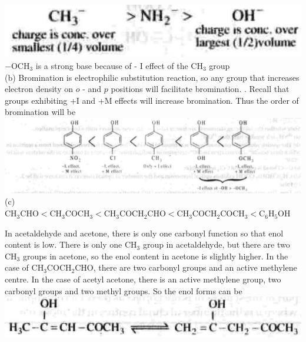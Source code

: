 \documentclass[10pt]{article}
\begin{document}
\includegraphics[max width=\textwidth, center]{2025_01_28_8470952b98110cec3aabg-127}\\
$-\mathrm{OCH}_{3}$ is a strong base because of - I effect of the $\mathrm{CH}_{3}$ group\\
(b) Bromination is electrophilic substitution reaction, so any group that increases electron density on $o$ - and $p$ positions will facilitate bromination. . Recall that groups exhibiting +I and +M effects will increase bromination. Thus the order of bromination will be\\
\includegraphics[max width=\textwidth, center]{2025_01_28_8470952b98110cec3aabg-128(3)}\\
(c) $\mathrm{CH}_{3} \mathrm{CHO}<\mathrm{CH}_{3} \mathrm{COCH}_{3}<\mathrm{CH}_{3} \mathrm{COCH}_{2} \mathrm{CHO}<\mathrm{CH}_{3} \mathrm{COCH}_{2} \mathrm{COCH}_{3}<\mathrm{C}_{6} \mathrm{H}_{5} \mathrm{OH}$

In acetaldehyde and acetone, there is only one carbonyl function so that enol content is low. There is only one $\mathrm{CH}_{3}$ group in acetaldehyde, but there are two $\mathrm{CH}_{3}$ groups in acetone, so the enol content in acetone is slightly higher. In the case of $\mathrm{CH}_{3} \mathrm{COCH}_{2} \mathrm{CHO}$, there are two carbonyl groups and an active methylene centre. In the case of acetyl acetone, there is an active methylene group, two carbonyl groups and two methyl groups. So the enol forms can be\\
\includegraphics[max width=\textwidth, center]{2025_01_28_8470952b98110cec3aabg-128(1)}
\end{document}
